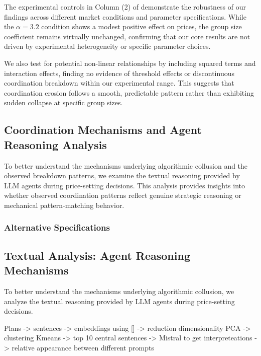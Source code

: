 The experimental controls in Column (2) of  demonstrate the robustness of our findings across different market conditions and parameter specifications. While the $\alpha = 3.2$ condition shows a modest positive effect on prices, the group size coefficient remains virtually unchanged, confirming that our core results are not driven by experimental heterogeneity or specific parameter choices.

We also test for potential non-linear relationships by including squared terms and interaction effects, finding no evidence of threshold effects or discontinuous coordination breakdown within our experimental range. This suggests that coordination erosion follows a smooth, predictable pattern rather than exhibiting sudden collapse at specific group sizes.

\subsection{Coordination Mechanisms and Agent Reasoning Analysis}

To better understand the mechanisms underlying algorithmic collusion and the observed breakdown patterns, we examine the textual reasoning provided by LLM agents during price-setting decisions. This analysis provides insights into whether observed coordination patterns reflect genuine strategic reasoning or mechanical pattern-matching behavior.


\subsubsection*{Alternative Specifications}


\subsection{Textual Analysis: Agent Reasoning Mechanisms}

To better understand the mechanisms underlying algorithmic collusion, we analyze the textual reasoning provided by LLM agents during price-setting decisions. 

Plans -> sentences -> embeddings using [] -> reduction dimensionality PCA -> clustering Kmeans -> top 10 central sentences -> Mistral to get interpreteations -> relative appearance between different prompts

